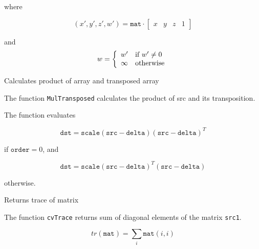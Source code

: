 where

\[ (x', y', z', w') = \texttt{mat} \cdot
\begin{bmatrix}
x & y & z & 1
\end{bmatrix}
\]

and
\[ w = \left\{ \begin{array}{l l} w' & \mbox{if $w' \ne 0$}\\ \infty & \mbox{otherwise}\\ \end{array} \right. \]

\label{MulTransposed}

Calculates product of array and transposed array


\begin{description}
\end{description}

The function \texttt{MulTransposed} calculates the product of src and its transposition.

The function evaluates

\[
\texttt{dst}=\texttt{scale} (\texttt{src}-\texttt{delta}) (\texttt{src}-\texttt{delta})^T
\]

if $\texttt{order}=0$, and

\[
\texttt{dst}=\texttt{scale} (\texttt{src}-\texttt{delta})^T (\texttt{src}-\texttt{delta})
\]

otherwise.

\label{Trace}

Returns trace of matrix


\begin{description}
\end{description}


The function \texttt{cvTrace} returns sum of diagonal elements of the matrix \texttt{src1}.

\[ tr(\texttt{mat}) = \sum_i \texttt{mat}(i,i) \]

\label{Transpose}

